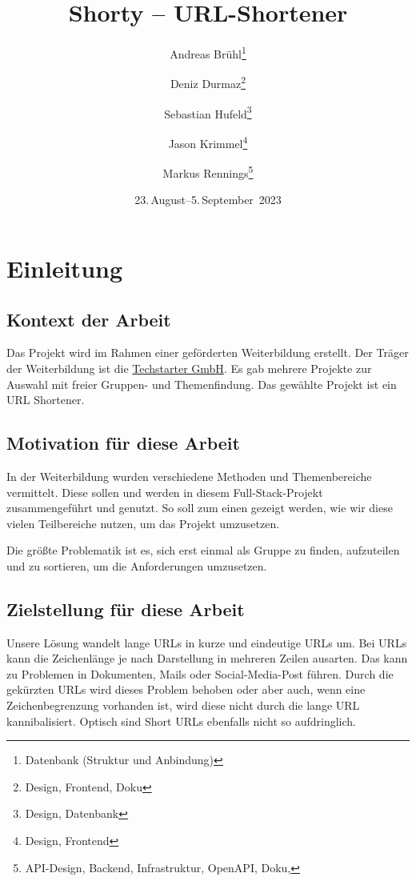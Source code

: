 \documentclass[a4paper,11pt,DIV=12,overfullrule=on]{scrreprt}
\title{Shorty – URL-Shortener}
\subtitle{}
\author{Andreas Brühl\thanks{Datenbank (Struktur und Anbindung)} \and Deniz Durmaz\thanks{Design, Frontend, Doku} \and Sebastian Hufeld\thanks{Design, Datenbank} \and Jason Krimmel\thanks{Design, Frontend} \and Markus Rennings\thanks{API-Design, Backend, Infrastruktur, OpenAPI, Doku, \XeLaTeX}}
\date{23.\,August–5.\,September~2023}
\begin{document}
\raggedbottom%
\maketitle

\tableofcontents

\chapter{Einleitung}
\section{Kontext der Arbeit}
Das Projekt wird im Rahmen einer geförderten Weiterbildung erstellt. Der Träger der Weiterbildung ist die \href{https://techstarter.de/}{Techstarter GmbH}. Es gab mehrere Projekte zur Auswahl mit freier Gruppen- und Themenfindung. Das gewählte Projekt ist ein URL Shortener.

\section{Motivation für diese Arbeit}
In der Weiterbildung wurden verschiedene Methoden und Themenbereiche vermittelt. Diese sollen und werden in diesem Full-Stack-Projekt zusammengeführt und genutzt. So soll zum einen gezeigt werden, wie wir diese vielen Teilbereiche nutzen, um das Projekt umzusetzen.

Die größte Problematik ist es, sich erst einmal als Gruppe zu finden, aufzuteilen und zu sortieren, um die Anforderungen umzusetzen.

\section{Zielstellung für diese Arbeit}
Unsere Lösung wandelt lange URLs in kurze und eindeutige URLs um. Bei URLs kann die Zeichenlänge je nach Darstellung in mehreren Zeilen ausarten. Das kann zu Problemen in Dokumenten, Mails oder Social-Media-Post führen. Durch die gekürzten URLs wird dieses Problem behoben oder aber auch, wenn eine Zeichenbegrenzung vorhanden ist, wird diese nicht durch die lange URL kannibalisiert. Optisch sind Short URLs ebenfalls nicht so aufdringlich.
\end{document}
